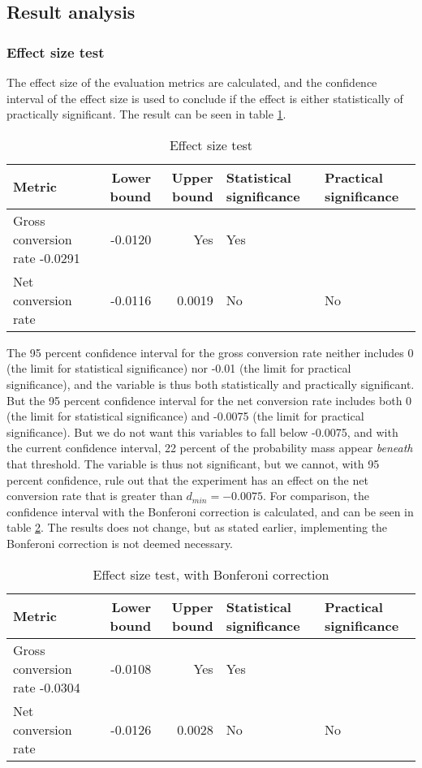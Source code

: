 \documentclass[12pt]{article}
\begin{document}
\subsection{Result analysis}
\subsubsection{Effect size test}
The effect size of the evaluation metrics are calculated, and the confidence interval of the effect size is used to conclude if the effect is either statistically of practically significant. The result can be seen in table \ref{tbl:effect}.

\begin{table}[h]
\centering
\caption{Effect size test}
\label{tbl:effect}
\begin{tabular}{@{}lrrll@{}}
\toprule
\textbf{Metric} & \textbf{Lower bound} & \textbf{Upper bound} & \textbf{Statistical significance} & \textbf{Practical significance} \\
\midrule
Gross conversion rate -0.0291	&	-0.0120 & Yes & Yes	 \\
Net conversion rate & -0.0116 & 0.0019 & No & No \\
\bottomrule
\end{tabular}
\end{table}

The 95 percent confidence interval for the gross conversion rate neither includes 0 (the limit for statistical significance) nor -0.01 (the limit for practical significance), and the variable is thus both statistically and practically significant.
\newline
But the 95 percent confidence interval for the net conversion rate includes both 0 (the limit for statistical significance) and -0.0075 (the limit for practical significance). But we do not want this variables to fall below -0.0075, and with the current confidence interval, 22 percent of the probability mass appear \textit{beneath} that threshold. The variable is thus not significant, but we cannot, with 95 percent confidence, rule out that the experiment has an effect on the net conversion rate that is greater than $d_{min}=-0.0075$.
\newline
For comparison, the confidence interval with the Bonferoni correction is calculated, and can be seen in table \ref{tbl:effectBonf}. The results does not change, but as stated earlier, implementing the Bonferoni correction is not deemed necessary.

\begin{table}[h]
\centering
\caption{Effect size test, with Bonferoni correction}
\label{tbl:effectBonf}
\begin{tabular}{@{}lrrll@{}}
\toprule
\textbf{Metric} & \textbf{Lower bound} & \textbf{Upper bound} & \textbf{Statistical significance} & \textbf{Practical significance} \\
\midrule
Gross conversion rate -0.0304	&	-0.0108 & Yes & Yes	 \\
Net conversion rate & -0.0126 & 0.0028 & No & No \\
\bottomrule
\end{tabular}
\end{table}
\end{document}
